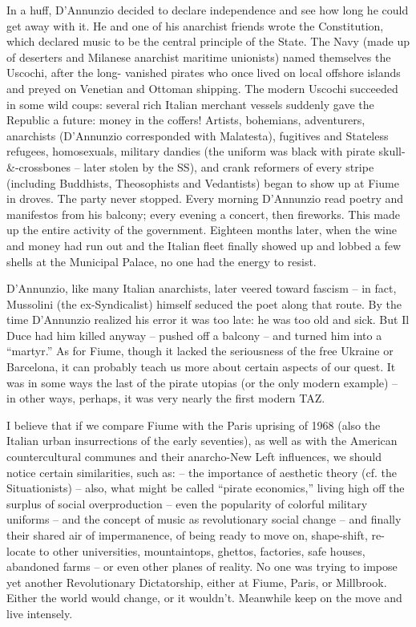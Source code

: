 \documentclass[a4paper,english,10pt,twoside]{article}
\begin{document}
\medskip
In a huff, D'Annunzio decided to declare independence and see how long he could get away with it. He and one of his anarchist friends wrote the Constitution, which declared music to be the central principle of the State. The Navy (made up of deserters and Milanese anarchist maritime unionists) named themselves the Uscochi, after the long- vanished pirates who once lived on local offshore islands and preyed on Venetian and Ottoman shipping. The modern Uscochi succeeded in some wild coups: several rich Italian merchant vessels suddenly gave the Republic a future: money in the coffers! Artists, bohemians, adventurers, anarchists (D'Annunzio corresponded with Malatesta), fugitives and Stateless refugees, homosexuals, military dandies (the uniform was black with pirate skull-\&-crossbones -- later stolen by the SS), and crank reformers of every stripe (including Buddhists, Theosophists and Vedantists) began to show up at Fiume in droves. The party never stopped. Every morning D'Annunzio read poetry and manifestos from his balcony; every evening a concert, then fireworks. This made up the entire activity of the government. Eighteen months later, when the wine and money had run out and the Italian fleet finally showed up and lobbed a few shells at the Municipal Palace, no one had the energy to resist.

\medskip
D'Annunzio, like many Italian anarchists, later veered toward fascism -- in fact, Mussolini (the ex-Syndicalist) himself seduced the poet along that route. By the time D'Annunzio realized his error it was too late: he was too old and sick. But Il Duce had him killed anyway -- pushed off a balcony -- and turned him into a \enquote{martyr.} As for Fiume, though it lacked the seriousness of the free Ukraine or Barcelona, it can probably teach us more about certain aspects of our quest. It was in some ways the last of the pirate utopias (or the only modern example) -- in other ways, perhaps, it was very nearly the first modern TAZ.

\medskip
I believe that if we compare Fiume with the Paris uprising of 1968 (also the Italian urban insurrections of the early seventies), as well as with the American countercultural communes and their anarcho-New Left influences, we should notice certain similarities, such as: -- the importance of aesthetic theory (cf. the Situationists) -- also, what might be called \enquote{pirate economics,} living high off the surplus of social overproduction -- even the popularity of colorful military uniforms -- and the concept of music as revolutionary social change -- and finally their shared air of impermanence, of being ready to move on, shape-shift, re- locate to other universities, mountaintops, ghettos, factories, safe houses, abandoned farms -- or even other planes of reality. No one was trying to impose yet another Revolutionary Dictatorship, either at Fiume, Paris, or Millbrook. Either the world would change, or it wouldn't. Meanwhile keep on the move and live intensely.
\end{document}
